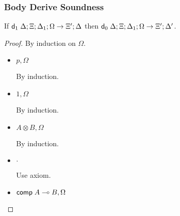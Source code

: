 \subsubsection{Body Derive Soundness}

If $\mathsf{d}_1 \; \Delta; \Xi; \Delta_1; \Omega \rightarrow \Xi'; \Delta$ then $\mathsf{d}_0 \; \Delta; \Xi; \Delta_1; \Omega \rightarrow \Xi'; \Delta'$.

\begin{proof}
   By induction on $\Omega$.
   
   \begin{itemize}
      \item $p, \Omega$
      
      By induction.
      
      \item $1, \Omega$
      
      By induction.
      
      \item $A \otimes B, \Omega$
      
      By induction.
      
      \item $\cdot$
      
      Use axiom.
      
      \item $\mathsf{comp} \; A \multimap B, \Omega$
      

\end{itemize}
\end{proof}
